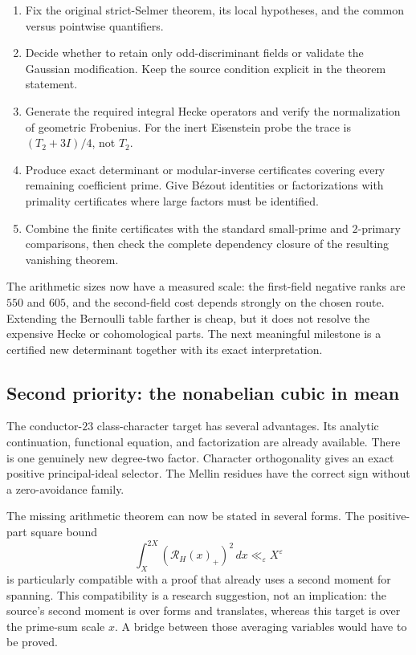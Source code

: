 \begin{enumerate}
\item Fix the original strict-Selmer theorem, its local hypotheses,
and the common versus pointwise quantifiers.
\item Decide whether to retain only odd-discriminant fields or
validate the Gaussian modification. Keep the source condition
explicit in the theorem statement.
\item Generate the required integral Hecke operators and verify
the normalization of geometric Frobenius. For the inert Eisenstein
probe the trace is $(T_2+3I)/4$, not $T_2$.
\item Produce exact determinant or modular-inverse certificates
covering every remaining coefficient prime. Give B\'ezout
identities or factorizations with primality certificates where
large factors must be identified.
\item Combine the finite certificates with the standard small-prime
and $2$-primary comparisons, then check the complete dependency
closure of the resulting vanishing theorem.
\end{enumerate}

The arithmetic sizes now have a measured scale: the first-field
negative ranks are $550$ and $605$, and the second-field cost
depends strongly on the chosen route. Extending the Bernoulli table
farther is cheap, but it does not resolve the expensive Hecke or
cohomological parts. The next meaningful milestone is a certified
new determinant together with its exact interpretation.

\subsection{Second priority: the nonabelian cubic in mean}

The conductor-$23$ class-character target has several advantages.
Its analytic continuation, functional equation, and factorization
are already available. There is one genuinely new degree-two
factor. Character orthogonality gives an exact positive
principal-ideal selector. The Mellin residues have the correct
sign without a zero-avoidance family.

The missing arithmetic theorem can now be stated in several
forms. The positive-part square bound
\[
 \int_X^{2X}(\mathcal R_H(x)_+)^2\,dx
       \ll_\varepsilon X^\varepsilon
\]
is particularly compatible with a proof that already uses a
second moment for spanning. This compatibility is a research
suggestion, not an implication: the source's second moment is
over forms and translates, whereas this target is over the
prime-sum scale $x$. A bridge between those averaging variables
would have to be proved.

